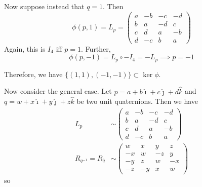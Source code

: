 \documentclass[12pt]{article}
\newcommand{\ihat}{\hat{\imath}}
\newcommand{\jhat}{\hat{\jmath}}
\newcommand{\khat}{\hat{k}}
\begin{document}
        Now suppose instead that $q = 1$. Then 
        \[\phi(p, 1) = L_p = \begin{pmatrix}
            a & -b & -c & -d \\
            b & a & -d & c \\
            c & d & a & -b \\
            d & -c & b & a
        \end{pmatrix}\]
        Again, this is $I_4$ iff $p = 1$. Further, 
        \[\phi(p, -1) = L_p \circ -I_4 = -L_p \implies p = -1\] 

        Therefore, we have $\{(1, 1), (-1, -1)\} \subset \ker \phi$.

        Now consider the general case. Let $p = a + b\ihat + c\jhat + d\khat$ and $q = w + x \ihat + y \jhat + z \khat$ be two unit quaternions. Then we have 
        \begin{align*}
            L_p &\sim \begin{pmatrix}
                a & -b & -c & -d \\
                b & a & -d & c \\
                c & d & a & -b \\
                d & -c & b & a
            \end{pmatrix}\\ 
            R_{q^{-1}} = R_{\bar q} &\sim \begin{pmatrix}
                w & x & y & z \\
                -x & w & -z & y \\
                -y & z & w & -x \\
                -z & -y & x & w
            \end{pmatrix}
        \end{align*}
        so 
\end{document}
